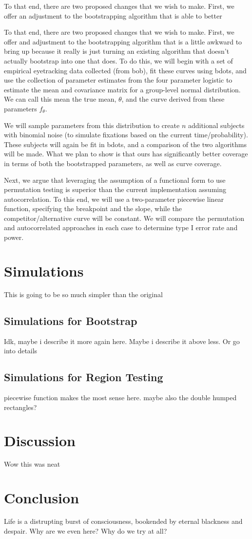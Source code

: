 \documentclass{article}
\begin{document}
To that end, there are two proposed changes that we wish to make. First, we offer an adjustment to the bootstrapping algorithm that is able to better

To that end, there are two proposed changes that we wish to make. First, we offer and adjustment to the bootstrapping algorithm that is a little awkward to bring up because it really is just turning an existing algorithm that doesn't actually bootstrap into one that does. To do this, we will begin with a set of empirical eyetracking data collected (from bob), fit these curves using bdots, and use the collection of parameter estimates from the four parameter logistic to estimate the mean and covariance matrix for a group-level normal distribution. We can call this mean the true mean, $\theta$, and the curve derived from these parameters $f_{\theta}$.

We will sample parameters from this distribution to create $n$ additional subjects with binomial noise (to simulate fixations based on the current time/probability). These subjects will again be fit in bdots, and a comparison of the two algorithms will be made. What we plan to show is that ours has significantly better coverage in terms of both the bootstrapped parameters, as well as curve coverage.

Next, we argue that leveraging the assumption of a functional form to use permutation testing is superior than the current implementation assuming autocorrelation. To this end, we will use a two-parameter piecewise linear function, specifying the breakpoint and the slope, while the competitor/alternative curve will be constant. We will compare the permutation and autocorrelated approaches in each case to determine type I error rate and power. 

\section{Simulations}

This is going to be so much simpler than the original

\subsection{Simulations for Bootstrap}

Idk, maybe i describe it more again here. Maybe i describe it above less. Or go into details


\subsection{Simulations for Region Testing}

piecewise function makes the most sense here. maybe also the double humped rectangles?

\section{Discussion}

Wow this was neat

\section{Conclusion}

Life is a distrupting burst of consciousness, bookended by eternal blackness and despair. Why are we even here? Why do we try at all?
\end{document}
